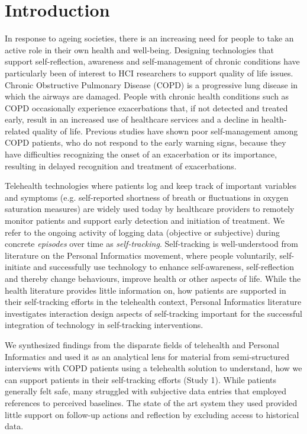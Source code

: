 \section{Introduction}

In response to ageing societies, there is an increasing need for people to take an active role in their own health and well-being. Designing technologies that support self-reflection, awareness and self-management of chronic conditions have particularly been of interest to HCI researchers to support quality of life issues. Chronic Obstructive Pulmonary Disease (COPD) is a progressive lung disease in which the airways are damaged. People with chronic health conditions such as COPD occasionally experience exacerbations that, if not detected and treated early, result in an increased use of healthcare services and a decline in health-related quality of life. Previous studies have shown poor self-management among COPD patients, who do not respond to the early warning signs, because they have difficulties recognizing the onset of an exacerbation or its importance, resulting in delayed recognition and treatment of exacerbations. 

Telehealth technologies where patients log and keep track of important variables and symptoms (e.g. self-reported shortness of breath or fluctuations in oxygen saturation measures) are widely used today by healthcare providers to remotely monitor patients and support early detection and initiation of treatment. We refer to the ongoing activity of logging data (objective or subjective) during concrete \textit{episodes} over time as \textit{self-tracking}. Self-tracking is well-understood from literature on the Personal Informatics movement, where people voluntarily, self-initiate and successfully use technology to enhance self-awareness, self-reflection and thereby change behaviours, improve health or other aspects of life. While the health literature provides little information on, how patients are supported in their self-tracking efforts in the telehealth context, Personal Informatics literature investigates interaction design aspects of self-tracking important for the successful integration of technology in self-tracking interventions. 

We synthesized findings from the disparate fields of telehealth and Personal Informatics and used it as an analytical lens for material from semi-structured interviews with COPD patients using a telehealth solution to understand, how we can support patients in their self-tracking efforts (Study 1). While patients generally felt safe, many struggled with subjective data entries that employed references to perceived baselines. The state of the art system they used provided little support on follow-up actions and reflection by excluding access to historical data. 

